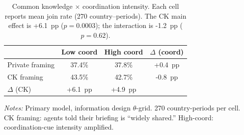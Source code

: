 \begin{table}[t]
\centering
\caption{Common knowledge $\times$ coordination intensity. Each cell reports mean join rate (270 country--periods). The CK main effect is +6.1~pp ($p = 0.0003$); the interaction is -1.2~pp ($p = 0.62$).}
\label{tab:ck_2x2}
\small
\begin{tabular}{lccc}
\toprule
& Low coord & High coord & $\Delta$ (coord) \\
\midrule
Private framing & 37.4\% & 37.8\% & +0.4~pp \\
CK framing      & 43.5\% & 42.7\% & -0.8~pp \\
\midrule
$\Delta$ (CK) & +6.1~pp & +4.9~pp & \\
\bottomrule
\end{tabular}
\vspace{0.25em}
\parbox{\columnwidth}{\footnotesize\emph{Notes:} Primary model, information design $\theta$-grid. 270 country-periods per cell. CK framing: agents told their briefing is ``widely shared.'' High-coord: coordination-cue intensity amplified.}
\end{table}
